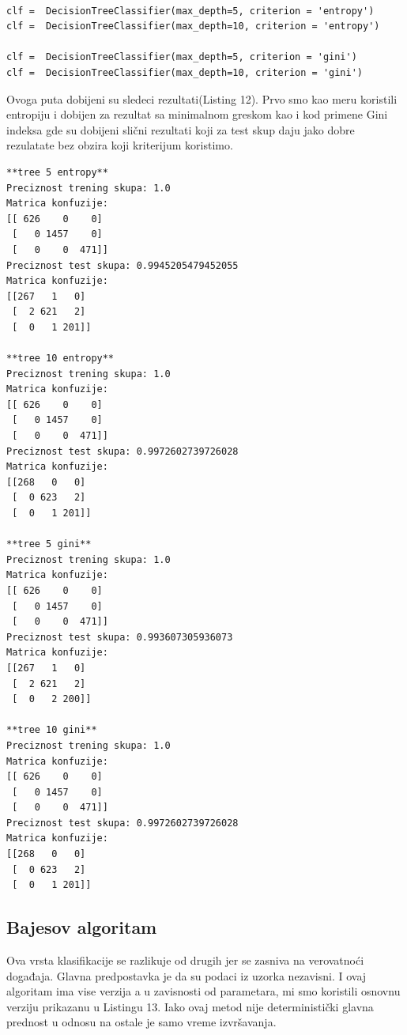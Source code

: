 \documentclass[14pt]{extarticle}
\begin{document}
\begin{lstlisting}[caption={Funkcije drveta odlučivanja},frame=single, label=simple]

clf =  DecisionTreeClassifier(max_depth=5, criterion = 'entropy')
clf =  DecisionTreeClassifier(max_depth=10, criterion = 'entropy')

clf =  DecisionTreeClassifier(max_depth=5, criterion = 'gini')
clf =  DecisionTreeClassifier(max_depth=10, criterion = 'gini')

\end{lstlisting}
Ovoga puta dobijeni su sledeci rezultati(Listing 12). Prvo smo kao meru koristili entropiju i dobijen za rezultat sa minimalnom greskom kao i kod primene Gini indeksa gde su dobijeni slični rezultati koji za test skup daju jako dobre rezulatate bez obzira koji kriterijum koristimo. 
\begin{lstlisting}[caption={Rezultati drveta odlučivanja},frame=single, label=simple]
**tree 5 entropy**
Preciznost trening skupa: 1.0
Matrica konfuzije:
[[ 626    0    0]
 [   0 1457    0]
 [   0    0  471]]
Preciznost test skupa: 0.9945205479452055
Matrica konfuzije:
[[267   1   0]
 [  2 621   2]
 [  0   1 201]]
 
**tree 10 entropy**
Preciznost trening skupa: 1.0
Matrica konfuzije:
[[ 626    0    0]
 [   0 1457    0]
 [   0    0  471]]
Preciznost test skupa: 0.9972602739726028
Matrica konfuzije:
[[268   0   0]
 [  0 623   2]
 [  0   1 201]]
 
**tree 5 gini**
Preciznost trening skupa: 1.0
Matrica konfuzije:
[[ 626    0    0]
 [   0 1457    0]
 [   0    0  471]]
Preciznost test skupa: 0.993607305936073
Matrica konfuzije:
[[267   1   0]
 [  2 621   2]
 [  0   2 200]]

**tree 10 gini**
Preciznost trening skupa: 1.0
Matrica konfuzije:
[[ 626    0    0]
 [   0 1457    0]
 [   0    0  471]]
Preciznost test skupa: 0.9972602739726028
Matrica konfuzije:
[[268   0   0]
 [  0 623   2]
 [  0   1 201]]

\end{lstlisting}
\subsection{Bajesov algoritam}
\label{subsec:podnaslovM}
Ova vrsta klasifikacije se razlikuje od drugih jer se zasniva na verovatnoći događaja. Glavna predpostavka je da su podaci iz uzorka nezavisni. I ovaj algoritam ima vise verzija a u zavisnosti od parametara, mi smo koristili osnovnu verziju prikazanu u Listingu 13. Iako ovaj metod nije deterministički glavna prednost u odnosu na ostale je samo vreme izvršavanja.
\end{document}
